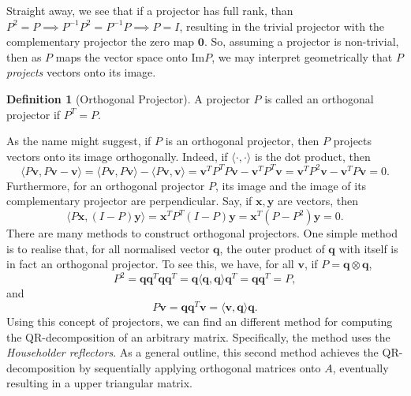 \documentclass[
]{article}
\theoremstyle{definition}
\theoremstyle{definition}
\newtheorem{definition}{Definition}[section]
\begin{document}
Straight away, we see that if a projector has full rank, than
\(P^2 = P \implies P^{-1} P^2 = P^{-1}P \implies P = I\), resulting in
the trivial projector with the complementary projector the zero map
\(\mathbf{0}\). So, assuming a projector is non-trivial, then as \(P\)
maps the vector space onto \(\text{Im} P\), we may interpret
geometrically that \(P\) \emph{projects} vectors onto its image.

\begin{definition}[Orthogonal Projector]
  A projector \(P\) is called an orthogonal projector if \(P^T = P\).
\end{definition}

As the name might suggest, if \(P\) is an orthogonal projector, then
\(P\) projects vectors onto its image orthogonally. Indeed, if
\(\langle \cdot, \cdot \rangle\) is the dot product, then
\[\langle P\mathbf{v}, P\mathbf{v} - \mathbf{v} \rangle 
  = \langle P\mathbf{v}, P\mathbf{v} \rangle - \langle P\mathbf{v}, \mathbf{v} \rangle 
  = \mathbf{v}^T P^T P \mathbf{v} - \mathbf{v}^T P^T \mathbf{v} 
  = \mathbf{v}^T P^2 \mathbf{v} - \mathbf{v}^T P \mathbf{v} = 0.\]
Furthermore, for an orthogonal projector \(P\), its image and the image
of its complementary projector are perpendicular. Say, if
\(\mathbf{x}, \mathbf{y}\) are vectors, then
\[\langle P\mathbf{x}, (I - P)\mathbf{y} \rangle = \mathbf{x}^T P^T (I - P) \mathbf{y} 
  = \mathbf{x}^T (P - P^2) \mathbf{y} = 0.\] There are many methods to
construct orthogonal projectors. One simple method is to realise that,
for all normalised vector \(\mathbf{q}\), the outer product of
\(\mathbf{q}\) with itself is in fact an orthogonal projector. To see
this, we have, for all \(\mathbf{v}\), if
\(P = \mathbf{q} \otimes \mathbf{q}\),
\[P^2 = \mathbf{q} \mathbf{q}^T \mathbf{q} \mathbf{q}^T 
  = \mathbf{q} \langle \mathbf{q}, \mathbf{q} \rangle \mathbf{q}^T = \mathbf{q} \mathbf{q}^T = P,\]
and \[P \mathbf{v} = \mathbf{q} \mathbf{q}^T \mathbf{v} 
  = \langle \mathbf{v}, \mathbf{q} \rangle \mathbf{q}.\] Using this
concept of projectors, we can find an different method for computing the
QR-decomposition of an arbitrary matrix. Specifically, the method uses
the \emph{Householder reflectors}. As a general outline, this second
method achieves the QR-decomposition by sequentially applying orthogonal
matrices onto \(A\), eventually resulting in a upper triangular matrix.
\end{document}
